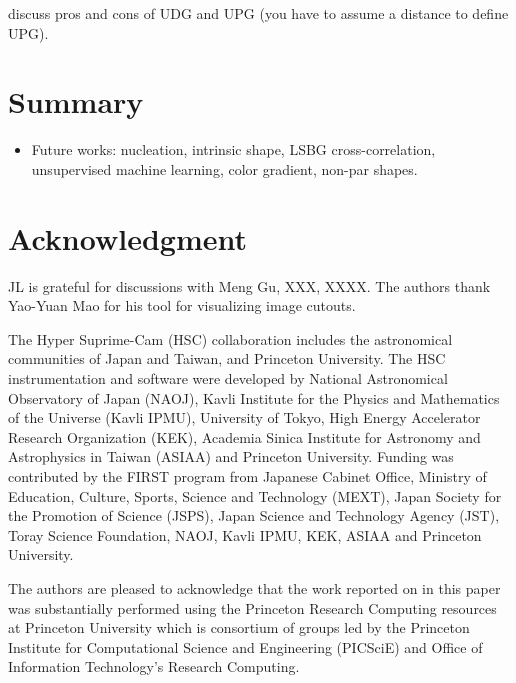\documentclass[twocolumn,astrosymb,twocolappendix]{aastex631}
\begin{document}
\begin{CJK*}{UTF8}{gbsn}
discuss pros and cons of UDG and UPG (you have to assume a distance to define UPG).




\section{Summary}
\begin{itemize}
    \item Future works: nucleation, intrinsic shape, LSBG cross-correlation, unsupervised machine learning, color gradient, non-par shapes.
\end{itemize}

\section*{Acknowledgment}
JL is grateful for discussions with Meng Gu, XXX, XXXX. The authors thank Yao-Yuan Mao for his tool for visualizing image cutouts. 

The Hyper Suprime-Cam (HSC) collaboration includes the astronomical communities of Japan and Taiwan, and Princeton University. The HSC instrumentation and software were developed by National Astronomical Observatory of Japan (NAOJ), Kavli Institute for the Physics and Mathematics of the Universe (Kavli IPMU), University of Tokyo, High Energy Accelerator Research Organization (KEK), Academia Sinica Institute for Astronomy and Astrophysics in Taiwan (ASIAA) and Princeton University.  
Funding was contributed by the FIRST program from Japanese Cabinet Office, Ministry of Education, Culture, Sports, Science and Technology (MEXT), Japan Society for the Promotion of Science (JSPS), Japan Science and Technology Agency (JST), Toray Science Foundation, NAOJ, Kavli IPMU, KEK, ASIAA and Princeton University.

The authors are pleased to acknowledge that the work reported on in this paper was substantially performed using the Princeton Research Computing resources at Princeton University which is consortium of groups led by the Princeton Institute for Computational Science and Engineering (PICSciE) and Office of Information Technology's Research Computing.


\end{CJK*}
\end{document}
